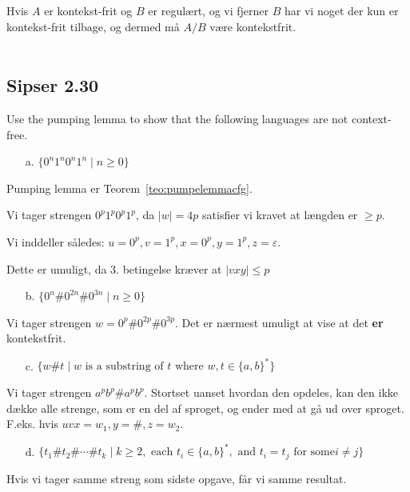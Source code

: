 Hvis $A$ er kontekst-frit og $B$ er regulært, og vi fjerner $B$ har vi noget der kun er kontekst-frit tilbage, og dermed må $A/B$ være kontekstfrit.\\\\

\noindent
\subsection*{Sipser 2.30}
\noindent
Use the pumping lemma to show that the following languages are not context-free.

\begin{enumerate}
  \item[a.] $\{0^{n}1^{n}0^{n}1^{n}\;|\; n \ge 0\}$
\end{enumerate}

Pumping lemma er Teorem~\ref{teo:pumpelemmacfg}.

Vi tager strengen $0^{p}1^{p}0^{p}1^{p}$, da $|w| = 4p$ satisfier vi kravet at længden er $\ge p$.

Vi inddeller således: $u= 0^{p}, v = 1^{p}, x = 0^{p}, y = 1^{p}, z = \varepsilon$.

Dette er umuligt, da 3. betingelse kræver at $|vxy| \leq p$

\begin{enumerate}
  \item[b.] $\{0^{n}\# 0^{2n} \# 0^{3n} \; | \; n \ge 0\}$
\end{enumerate}

Vi tager strengen $w = 0^{p}\#0^{2p}\#0^{3p}$. Det er nærmest umuligt at vise at det \textbf{er} kontekstfrit.

\begin{enumerate}
  \item[c.] $\{w\#t \; | \; w \text{ is a substring of }t \text{ where }w,t \in \{a,b\}^{*}\}$
\end{enumerate}

Vi tager strengen $a^{p}b^{p}\#a^{p}b^{p}$. Stortset uanset hvordan den opdeles, kan den ikke dække alle strenge, som er en del af sproget, og ender med at gå ud over sproget. F.eks. hvis $uvx = w_{1}, y = \#, z = w_{2}$.

\begin{enumerate}
  \item[d.] $\{t_{1}\#t_{2}\# \cdots \# t_{k}\;|\; k \ge 2, \text{ each } t_{i} \in \{a,b\}^{*}, \text{ and } t_{i}=t_{j} \text{ for some} i \ne j\}$
\end{enumerate}
Hvis vi tager samme streng som sidste opgave, får vi samme resultat.\\\\
\noindent
